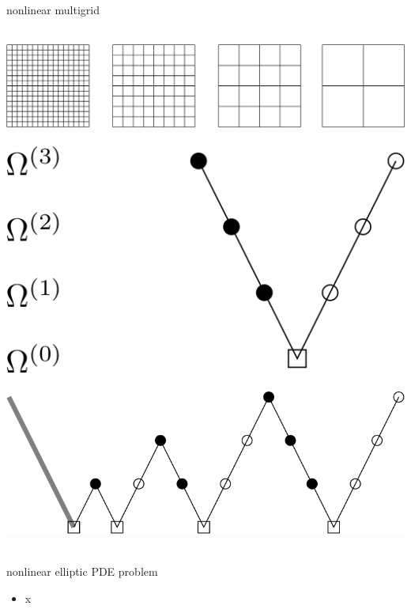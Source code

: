 \documentclass[svgnames,
               hyperref={colorlinks,citecolor=DeepPink4,linkcolor=FireBrick,urlcolor=Maroon},
               usepdftitle=false]  %
               {beamer}
\begin{document}
\begin{frame}{nonlinear multigrid}

\mbox{
\includegraphics[height=0.10\textheight]{images/mg-grids.png} \qquad \includegraphics[height=0.15\textheight]{images/mg-vcycle.png} \quad
\includegraphics[height=0.15\textheight]{images/mg-fcycle.png}
}

\bigskip
{}
\end{frame}


\begin{frame}{nonlinear elliptic PDE problem}

\begin{itemize}
\item x
\end{itemize}
\end{frame}
\end{document}
